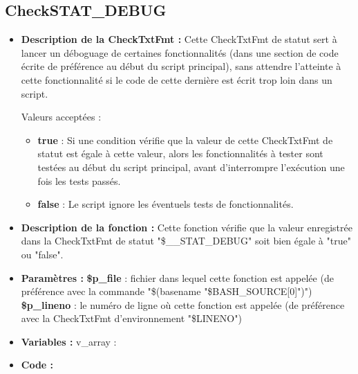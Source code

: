 \documentclass[a4paper,10pt]{article}
\begin{document}
\subsection{CheckSTAT\_DEBUG}\color{white}
\begin{itemize}
    \item \textbf{Description de la CheckTxtFmt :} Cette CheckTxtFmt de statut sert à lancer un déboguage de certaines fonctionnalités (dans une section de code écrite de préférence au début du script principal), sans attendre l'atteinte à cette fonctionnalité si le code de cette dernière est écrit trop loin dans un script.
    
    Valeurs acceptées :
    \begin{itemize}
        \item \textbf{true} : Si une condition vérifie que la valeur de cette CheckTxtFmt de statut est égale à cette valeur, alors les fonctionnalités à tester sont testées au début du script principal, avant d'interrompre l'exécution une fois les tests passés.
        \item \textbf{false} : Le script ignore les éventuels tests de fonctionnalités. 
    \end{itemize}

    \item \textbf{Description de la fonction :} Cette fonction vérifie que la valeur enregistrée dans la CheckTxtFmt de statut "\$\_\_STAT\_DEBUG" soit bien égale à "true" ou "false".

    \item \textbf{Paramètres :}
        \color{orange}\textbf{\$p\_file}\color{white} : fichier dans lequel cette fonction est appelée (de préférence avec la commande "\$(\color{gray}basename \color{white}"\color{orange}\$BASH\_SOURCE[0]\color{white}")")
    \color{orange}\textbf{\$p\_lineno}\color{white} : le numéro de ligne où cette fonction est appelée (de préférence avec la CheckTxtFmt d'environnement "\color{orange}\$LINENO\color{white}")

    \item \textbf{Variables :} v\_array :

    \item \textbf{Code :}
\end{itemize}

\color{green}
\end{document}
